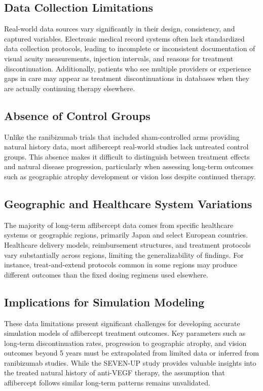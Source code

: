 \subsection{Data Collection Limitations}

Real-world data sources vary significantly in their design, consistency, and captured variables. Electronic medical record systems often lack standardized data collection protocols, leading to incomplete or inconsistent documentation of visual acuity measurements, injection intervals, and reasons for treatment discontinuation. Additionally, patients who see multiple providers or experience gaps in care may appear as treatment discontinuations in databases when they are actually continuing therapy elsewhere.

\subsection{Absence of Control Groups}

Unlike the ranibizumab trials that included sham-controlled arms providing natural history data, most aflibercept real-world studies lack untreated control groups. This absence makes it difficult to distinguish between treatment effects and natural disease progression, particularly when assessing long-term outcomes such as geographic atrophy development or vision loss despite continued therapy.

\subsection{Geographic and Healthcare System Variations}

The majority of long-term aflibercept data comes from specific healthcare systems or geographic regions, primarily Japan and select European countries. Healthcare delivery models, reimbursement structures, and treatment protocols vary substantially across regions, limiting the generalizability of findings. For instance, treat-and-extend protocols common in some regions may produce different outcomes than the fixed dosing regimens used elsewhere.

\subsection{Implications for Simulation Modeling}

These data limitations present significant challenges for developing accurate simulation models of aflibercept treatment outcomes. Key parameters such as long-term discontinuation rates, progression to geographic atrophy, and vision outcomes beyond 5 years must be extrapolated from limited data or inferred from ranibizumab studies. While the SEVEN-UP study provides valuable insights into the treated natural history of anti-VEGF therapy, the assumption that aflibercept follows similar long-term patterns remains unvalidated.


